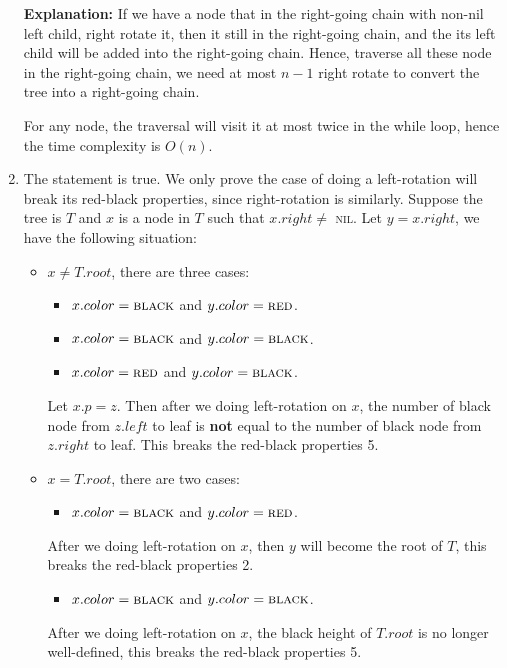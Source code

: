 \documentclass[12pt,a4paper,titlepage,AutoFakeBold]{article}
\newcounter{prop}
\begin{document}
\begin{enumerate}[label=\arabic*.,topsep=0pt]
\begin{minipage}[t]{\linewidth}
\begin{algorithm}[H]
        \end{algorithm}
    \end{minipage}
    \textbf{Explanation:} If we have a node that in the right-going chain with non-nil left child, right rotate it, 
    then it still in the right-going chain, and the its left child will be added into the right-going chain.
    Hence, traverse all these node in the right-going chain, we need at most $n - 1$ right rotate to convert the tree into
    a right-going chain.
    
    For any node, the traversal will visit it at most twice in the while loop, hence the time complexity is $O(n)$.
    \item The statement is true. We only prove the case of doing a left-rotation will break its red-black properties, since right-rotation is similarly. Suppose the tree is $T$ and $x$ is a node in $T$ such that $x.right \neq $ \textsc{nil}. Let $y = x.right$, we have the following situation:
    
    \begin{itemize}[topsep=0pt]
        \item $x\neq T.root$, there are three cases:
        \begin{itemize}[noitemsep,topsep=0pt]
            \item $x.color = \textsc{black}$ and $y.color = \textsc{red}$.
            \item  $x.color = \textsc{black}$ and $y.color = \textsc{black}$.
            \item $x.color = \textsc{red}$ and $y.color = \textsc{black}$.
        \end{itemize}
        Let $x.p = z$. Then after we doing left-rotation on $x$, the number of black node from $z.left$ to leaf is \textbf{not} equal to the number of black node from $z.right$ to leaf. This breaks the red-black properties 5.
        \item $x = T.root$, there are two cases:
        \begin{itemize}[noitemsep,topsep=0pt]
            \item $x.color = \textsc{black}$ and $y.color = \textsc{red}$. 
        \end{itemize}
        After we doing left-rotation on $x$, then $y$ will become the root of $T$, this breaks the red-black properties 2.

        \begin{itemize}[noitemsep,topsep=0pt]
            \item  $x.color = \textsc{black}$ and $y.color = \textsc{black}$. 
        \end{itemize}
        After we doing left-rotation on $x$, the black height of $T.root$ is no longer well-defined, this breaks the red-black properties 5.   
    \end{itemize}
   

\end{enumerate}
\end{document}
